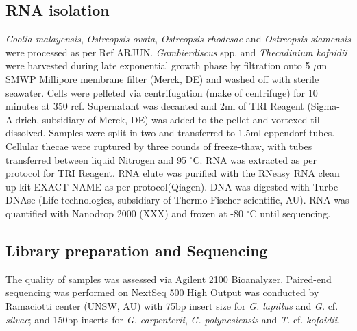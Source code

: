 \documentclass[12pt]{article}
\begin{document}
 \subsection*{RNA isolation}
\textit{Coolia malayensis}, \textit{Ostreopsis ovata}, \textit{Ostreopsis rhodesae} and \textit{Ostreopsis siamensis} were processed as per Ref ARJUN.
\emph{Gambierdiscus} spp. and \emph{Thecadinium kofoidii} were harvested during late exponential growth phase by filtration onto 5 $\mu$m SMWP Millipore membrane filter (Merck, DE) and washed off with sterile seawater. 
Cells were pelleted via centrifugation (make of centrifuge) for 10 minutes at 350 rcf. 
Supernatant was decanted and 2ml of TRI Reagent (Sigma-Aldrich, subsidiary of Merck, DE) was added to the pellet and vortexed till dissolved. 
Samples were split in two and transferred to 1.5ml eppendorf tubes. 
Cellular thecae were ruptured by three rounds of freeze-thaw, with tubes transferred between liquid Nitrogen and 95 $^{\circ}$C. 
RNA was extracted as per protocol for TRI Reagent. 
RNA elute was purified with the RNeasy RNA clean up kit EXACT NAME as per protocol(Qiagen). 
DNA was digested with Turbe DNAse (Life technologies, subsidiary of Thermo Fischer scientific, AU). 
RNA was quantified with Nanodrop 2000 (XXX) and frozen at -80 $^{\circ}$C until sequencing.
 
\subsection*{Library preparation and Sequencing}
The quality of samples was assessed via Agilent 2100 Bioanalyzer. 
Paired-end sequencing was performed on NextSeq 500 High Output was conducted by Ramaciotti center (UNSW, AU) with 75bp insert size for \emph{G. lapillus} and \emph{G.} cf. \emph{silvae}; and 150bp inserts for \emph{G. carpenterii}, \emph{G. polynesiensis} and \emph{T.} cf. \emph{kofoidii}.


\end{document}
